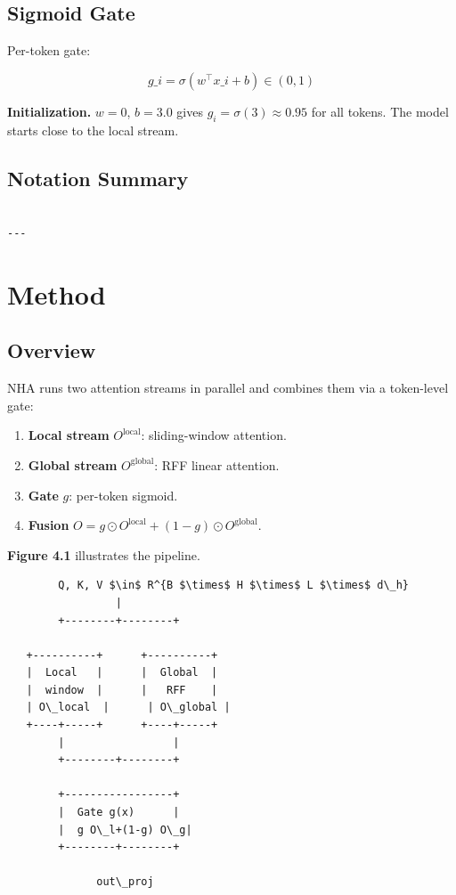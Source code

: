 \subsection{Sigmoid Gate}

Per-token gate:

\[
g\_i = \sigma(w^\top x\_i + b) \in (0, 1)
\tag{3.10}
\]

\textbf{Initialization.} $w = 0$, $b = 3.0$ gives $g_i = \sigma(3) \approx 0.95$ 
for all tokens. The model starts close to the local stream.

\subsection{Notation Summary}

\begin{lstlisting}

---
\end{lstlisting}


\section{Method}

\subsection{Overview}

NHA runs two attention streams in parallel and combines them via a token-level 
gate:

\begin{enumerate}
\item \textbf{Local stream} $O^\text{local}$: sliding-window attention.
\item \textbf{Global stream} $O^\text{global}$: RFF linear attention.
\item \textbf{Gate} $g$: per-token sigmoid.
\item \textbf{Fusion} $O = g \odot O^\text{local} + (1 - g) \odot O^\text{global}$.

\end{enumerate}
\textbf{Figure 4.1} illustrates the pipeline.

\begin{lstlisting}
        Q, K, V $\in$ R^{B $\times$ H $\times$ L $\times$ d\_h}
                 |
        +--------+--------+
                           
   +----------+      +----------+
   |  Local   |      |  Global  |
   |  window  |      |   RFF    |
   | O\_local  |      | O\_global |
   +----+-----+      +----+-----+
        |                 |
        +--------+--------+
                  
        +-----------------+
        |  Gate g(x)      |
        |  g O\_l+(1-g) O\_g|
        +--------+--------+
                  
              out\_proj
\end{lstlisting}

